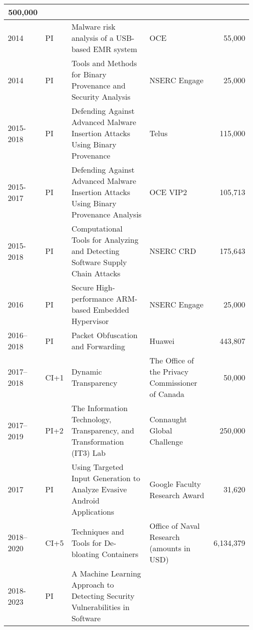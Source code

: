 \documentclass[10pt]{article}
\newenvironment{lonelist}[1][\enskip\textbullet]%
        {\vspace{-\baselineskip}\begin{list}{#1}{%
        \setlength{\partopsep}{0pt}%
        \setlength{\topsep}{0pt}
	\setlength{\leftmargin}{0pt}}}
        {\end{list}\vspace{-.6\baselineskip}}
\begin{document}
\begin{lonelist}
\begin{longtable}[h]{@{}|p{30pt}|p{6pt}|p{125pt}|p{65pt}|p{30pt}|}
\multicolumn{1}{|r|}{500,000} \\ \hline
2014 & PI & Malware risk analysis of a USB-based EMR system & OCE & 
\multicolumn{1}{|r|}{55,000} \\ \hline
2014 & PI & Tools and Methods for Binary Provenance and Security Analysis& NSERC Engage & 
\multicolumn{1}{|r|}{25,000} \\ \hline
2015-2018 & PI & Defending Against Advanced Malware Insertion Attacks Using Binary Provenance & Telus & 
\multicolumn{1}{|r|}{115,000} \\ \hline
2015-2017 & PI & Defending Against Advanced Malware Insertion Attacks Using Binary Provenance Analysis & OCE VIP2 & 
\multicolumn{1}{|r|}{105,713} \\ \hline
2015-2018 & PI & Computational Tools for Analyzing and Detecting Software Supply Chain Attacks & NSERC CRD & 
\multicolumn{1}{|r|}{175,643} \\ \hline
2016 & PI & Secure High-performance ARM-based Embedded Hypervisor & NSERC Engage & 
\multicolumn{1}{|r|}{25,000} \\ \hline
2016--2018 & PI &  Packet Obfuscation and Forwarding & Huawei & 
\multicolumn{1}{|r|}{443,807} \\ \hline
2017--2018 & CI+1 & Dynamic Transparency & The Office of the Privacy Commissioner of Canada & 
\multicolumn{1}{|r|}{50,000} \\ \hline
2017--2019 & PI+2 & The Information Technology, Transparency, and Transformation (IT3) Lab & Connaught Global Challenge & 
\multicolumn{1}{|r|}{250,000} \\ \hline
2017 & PI & Using Targeted Input Generation to Analyze Evasive Android Applications & Google Faculty Research Award & 
\multicolumn{1}{|r|}{31,620} \\ \hline
2018--2020 & CI+5 & 
Techniques and Tools for De-bloating Containers & 
Office of Naval Research (amounts in USD) & 
\multicolumn{1}{|r|}{6,134,379} \\ \hline
2018-2023 & PI & 
A Machine Learning Approach to Detecting Security Vulnerabilities in Software &

\end{longtable}
\end{lonelist}
\end{document}
